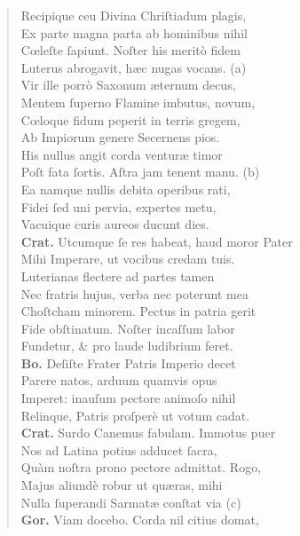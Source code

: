 \documentclass[a4paper,12pt]{article}
\begin{document}
\begin{verse}
Recipique ceu Divina Chriſtiadum plagis,\\[0pt]
Ex parte magna parta ab hominibus nihil\\[0pt]
Cœleſte ſapiunt. Noſter his meritò fidem\\[0pt]
Luterus abrogavit, hæc nugas vocans. (a)\footnotemark\\[0pt]
Vir ille porrò Saxonum æternum decus,\\[0pt]
Mentem ſuperno Flamine imbutus, novum,\\[0pt]
Cœloque fidum peperit in terris gregem,\\[0pt]
Ab Impiorum genere Secernens pios.\\[0pt]
His nullus angit corda venturæ timor\\[0pt]
Poſt fata ſortis. Aſtra jam tenent manu. (b)\footnotemark\\[0pt]
Ea namque nullis debita operibus rati,\\[0pt]
Fidei ſed uni pervia, expertes metu,\\[0pt]
Vacuique curis aureos ducunt dies.\\[0pt]
\textbf{Crat.} Utcumque ſe res habeat, haud moror Pater\\[0pt]
Mihi Imperare, ut vocibus credam tuis.\\[0pt]
Luterianas flectere ad partes tamen\\[0pt]
Nec fratris hujus, verba nec poterunt mea\\[0pt]
Choſtcham minorem. Pectus in patria gerit\\[0pt]
Fide obſtinatum. Noſter incaſſum labor\\[0pt]
Fundetur, \& pro laude ludibrium feret.\\[0pt]
\textbf{Bo.} Deſiſte Frater Patris Imperio decet\\[0pt]
Parere natos, arduum quamvis opus\\[0pt]
Imperet: inauſum pectore animoſo nihil\\[0pt]
Relinque, Patris proſperè ut votum cadat.\\[0pt]
\textbf{Crat.} Surdo Canemus fabulam. Immotus puer\\[0pt]
Nos ad Latina potius adducet ſacra,\\[0pt]
Quàm noſtra prono pectore admittat. Rogo,\\[0pt]
Majus aliundè robur ut quæras, mihi\\[0pt]
Nulla ſuperandi Sarmatæ conſtat via (c)\footnotemark\\[0pt]
\textbf{Gor.} Viam docebo. Corda nil citius domat,\\[0pt]

\end{verse}
\end{document}

